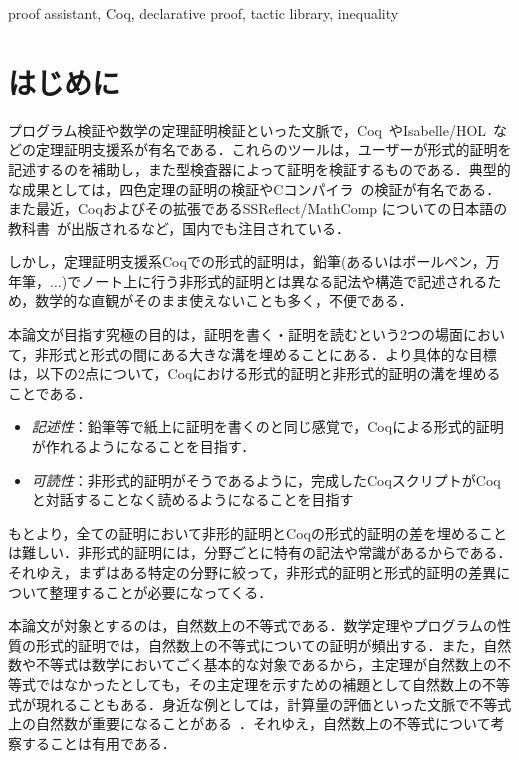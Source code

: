 \documentclass[submit]{ipsj}
\begin{document}
\begin{ekeyword}
proof assistant, Coq, declarative proof, tactic library, inequality
\end{ekeyword}

\maketitle

\section{はじめに}

プログラム検証や数学の定理証明検証といった文脈で，Coq~\cite{09thecoq}やIsabelle/HOL~\cite{Nipkow:2002:IPA:1791547}などの定理証明支援系が有名である．これらのツールは，ユーザーが形式的証明を記述するのを補助し，また型検査器によって証明を検証するものである．典型的な成果としては，四色定理の証明の検証\cite{FourColorTheorem}やCコンパイラ~\cite{CompCert}の検証が有名である．また最近，Coqおよびその拡張であるSSReflect/MathComp についての日本語の教科書~\cite{hagiwara_afelt2018}が出版されるなど，国内でも注目されている．

しかし，定理証明支援系Coqでの形式的証明は，鉛筆(あるいはボールペン，万年筆，$\ldots$)でノート上に行う非形式的証明とは異なる記法や構造で記述されるため，数学的な直観がそのまま使えないことも多く，不便である．

本論文が目指す究極の目的は，証明を書く・証明を読むという2つの場面において，非形式と形式の間にある大きな溝を埋めることにある．より具体的な目標は，以下の2点について，Coqにおける形式的証明と非形式的証明の溝を埋めることである．
\begin{itemize}
\item \emph{記述性}：鉛筆等で紙上に証明を書くのと同じ感覚で，Coqによる形式的証明が作れるようになることを目指す．
\item \emph{可読性}：非形式的証明がそうであるように，完成したCoqスクリプトがCoqと対話することなく読めるようになることを目指す
\end{itemize}
もとより，全ての証明において非形的証明とCoqの形式的証明の差を埋めることは難しい．非形式的証明には，分野ごとに特有の記法や常識があるからである．それゆえ，まずはある特定の分野に絞って，非形式的証明と形式的証明の差異について整理することが必要になってくる．

本論文が対象とするのは，自然数上の不等式である．数学定理やプログラムの性質の形式的証明では，自然数上の不等式についての証明が頻出する．また，自然数や不等式は数学においてごく基本的な対象であるから，主定理が自然数上の不等式ではなかったとしても，その主定理を示すための補題として自然数上の不等式が現れることもある．身近な例としては，計算量の評価といった文脈で不等式上の自然数が重要になることがある~\cite{Cormen:2009:IAT:1614191}．それゆえ，自然数上の不等式について考察することは有用である．
\end{document}
